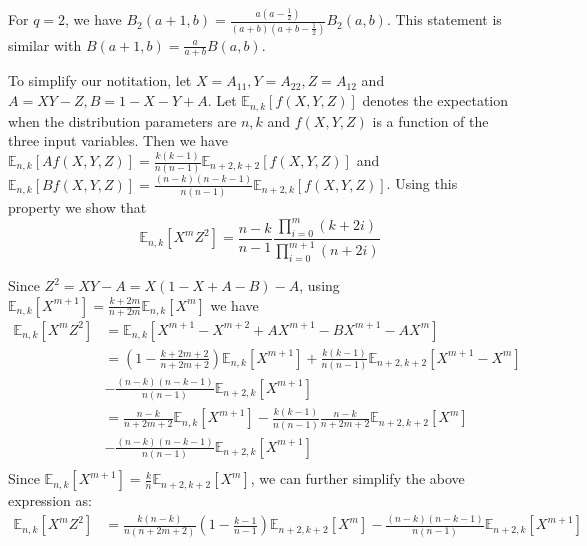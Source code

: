 \documentclass{article}
\def\E{\mathbb{E}}
\begin{document}
For $q=2$, we have $B_2(a+1,b)=\frac{a(a-\frac{1}{2})}{(a+b)(a+b-\frac{1}{2})} B_2(a,b)$. This statement is similar with
$B(a+1,b) = \frac{a}{a+b}B(a,b)$.

To simplify our notitation, let $X = A_{11}, Y = A_{22}, Z = A_{12}$ and $A = XY - Z, B = 1 - X - Y + A$. Let $\E_{n,k}[f(X,Y,Z)]$ denotes the expectation when the distribution parameters are $n, k$ and $f(X,Y,Z)$ is a function of the three input variables. Then we have $\E_{n,k}[Af(X,Y,Z)] = \frac{k(k-1)}{n(n-1)}\E_{n+2,k+2}[f(X,Y,Z)]$ and $\E_{n,k}[Bf(X,Y,Z)] = \frac{(n-k)(n-k-1)}{n(n-1)}\E_{n+2, k}[f(X,Y,Z)]$. Using this property we show that
\begin{equation}\label{eq:XZm2}
\E_{n,k}[X^m Z^2] = \frac{n-k}{n-1}\frac{\prod_{i=0}^m (k+2i)}{\prod_{i=0}^{m+1} (n+2i)}
\end{equation}

Since $Z^2 = XY - A = X(1-X+A-B)-A$, using $\E_{n,k}[X^{m+1}] = \frac{k+2m}{n+2m}\E_{n,k}[X^m]$ we have
\begin{align*}
\E_{n,k}[X^m Z^2] & = \E_{n,k}[X^{m+1}-X^{m+2}+AX^{m+1}-BX^{m+1}-AX^m] \\
& = (1-\frac{k+2m+2}{n+2m+2})\E_{n,k}[X^{m+1}] + \frac{k(k-1)}{n(n-1)}\E_{n+2,k+2}[X^{m+1} - X^m]\\
& - \frac{(n-k)(n-k-1)}{n(n-1)} \E_{n+2,k}[X^{m+1}] \\
& = \frac{n-k}{n+2m+2}\E_{n,k}[X^{m+1}] - \frac{k(k-1)}{n(n-1)}\frac{n-k}{n+2m+2}\E_{n+2,k+2}[X^m] \\
& - \frac{(n-k)(n-k-1)}{n(n-1)} \E_{n+2,k}[X^{m+1}] \\
\end{align*}
Since $\E_{n,k}[X^{m+1}] = \frac{k}{n}\E_{n+2,k+2}[X^m]$, we can further simplify the above expression as:
\begin{align*}
\E_{n,k}[X^m Z^2] &= \frac{k(n-k)}{n(n+2m+2)}(1-\frac{k-1}{n-1})\E_{n+2,k+2}[X^m]- \frac{(n-k)(n-k-1)}{n(n-1)} \E_{n+2,k}[X^{m+1}]
\end{align*}


\end{document}
